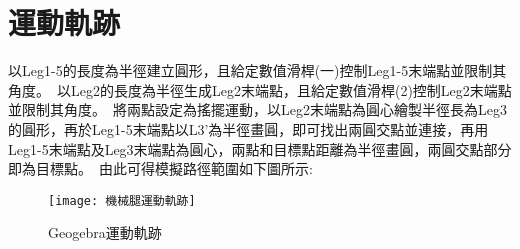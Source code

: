 \section{運動軌跡}
以Leg1-5的長度為半徑建立圓形，且給定數值滑桿(一)控制Leg1-5末端點並限制其角度。\
以Leg2的長度為半徑生成Leg2末端點，且給定數值滑桿(2)控制Leg2末端點並限制其角度。\
將兩點設定為搖擺運動，以Leg2末端點為圓心繪製半徑長為Leg3的圓形，再於Leg1-5末端點以L3’為半徑畫圓，即可找出兩圓交點並連接，再用Leg1-5末端點及Leg3末端點為圓心，兩點和目標點距離為半徑畫圓，兩圓交點部分即為目標點。\
由此可得模擬路徑範圍如下圖所示:\\
\begin{figure}[hbt!]
\begin{center}
\texttt{[image: 機械腿運動軌跡]}
\caption{\Large Geogebra運動軌跡}\label{機械腿運動軌跡}
\end{center}
\end{figure}
\newpage
